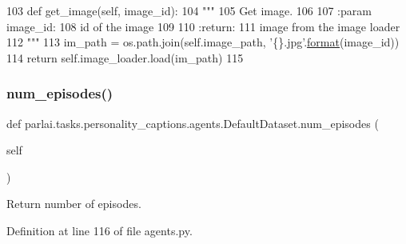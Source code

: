 \begin{DoxyCode}
103     \textcolor{keyword}{def }get\_image(self, image\_id):
104         \textcolor{stringliteral}{"""}
105 \textcolor{stringliteral}{        Get image.}
106 \textcolor{stringliteral}{}
107 \textcolor{stringliteral}{        :param image\_id:}
108 \textcolor{stringliteral}{            id of the image}
109 \textcolor{stringliteral}{}
110 \textcolor{stringliteral}{        :return:}
111 \textcolor{stringliteral}{            image from the image loader}
112 \textcolor{stringliteral}{        """}
113         im\_path = os.path.join(self.image\_path, \textcolor{stringliteral}{'\{\}.jpg'}.\hyperlink{namespaceparlai_1_1chat__service_1_1services_1_1messenger_1_1shared__utils_a32e2e2022b824fbaf80c747160b52a76}{format}(image\_id))
114         \textcolor{keywordflow}{return} self.image\_loader.load(im\_path)
115 
\end{DoxyCode}
\mbox{\label{classparlai_1_1tasks_1_1personality__captions_1_1agents_1_1DefaultDataset_a09fb1bf7bf9dc5ab00ef9f32388336ea}} 
\subsubsection{\texorpdfstring{num\+\_\+episodes()}{num\_episodes()}}
{\footnotesize\ttfamily def parlai.\+tasks.\+personality\+\_\+captions.\+agents.\+Default\+Dataset.\+num\+\_\+episodes (\begin{DoxyParamCaption}\item[{}]{self }\end{DoxyParamCaption})}

\begin{DoxyVerb}Return number of episodes.
\end{DoxyVerb}
 

Definition at line 116 of file agents.\+py.


